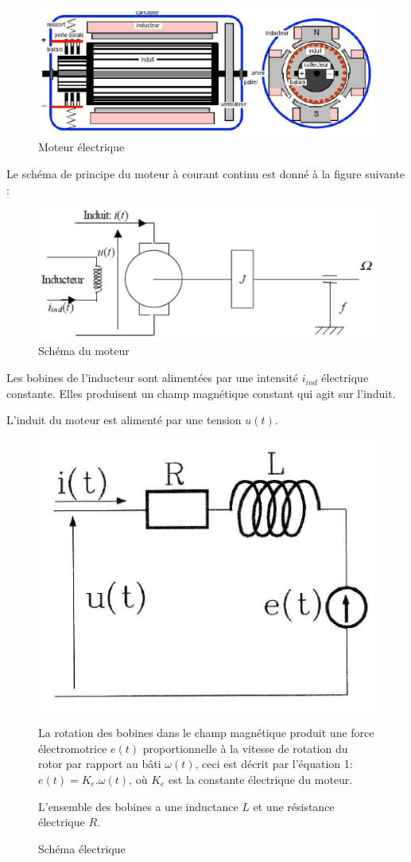 \begin{figure}[!h]
 \centering\includegraphics[width=0.65\linewidth]{img/maxpid1.png}
 \caption{Moteur électrique}
 \label{maxpid1}
\end{figure}

Le schéma de principe du moteur à courant continu est donné à la figure suivante :

\begin{figure}[!h]
 \centering\includegraphics[width=0.7\linewidth]{img/maxpid2.png}
 \caption{Schéma du moteur}
 \label{maxpid2}
\end{figure}

Les bobines de l'inducteur sont alimentées par une intensité $i_{ind}$ électrique constante. Elles produisent un champ magnétique constant qui agit sur l'induit.

L'induit du moteur est alimenté par une tension $u(t)$.

\begin{figure}[!h]
\begin{minipage}{0.45\linewidth}
 \centering\includegraphics[width=0.7\linewidth]{img/maxpid3.png}
  \caption{Schéma électrique}
 \label{maxpid3}
\end{minipage}
\hfill
\begin{minipage}{0.5\linewidth}
La rotation des bobines dans le champ magnétique produit une force électromotrice $e(t)$ proportionnelle à la vitesse de rotation du rotor par rapport au bâti $\omega(t)$, ceci est décrit par l'équation 1: $e(t)=K_e.\omega(t)$, où $K_e$ est la constante électrique du moteur.

L'ensemble des bobines a une inductance $L$ et une résistance électrique $R$.
\end{minipage}
\end{figure}

